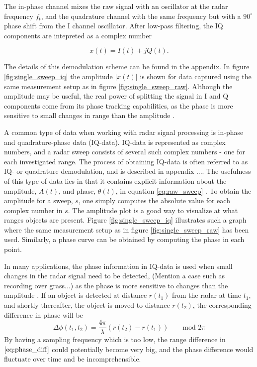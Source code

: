 The in-phase channel mixes the raw signal with an oscillator at the radar frequency $f_t$, and the quadrature channel with the same frequency but with a $90^\circ$ phase shift from the I channel oscillator. After low-pass filtering, the IQ components are intepreted as a complex number

\begin{equation}
	x(t) = I(t) + jQ(t).
\end{equation}

The details of this demodulation scheme can be found in the appendix. In figure \ref{fig:single_sweep_iq} the amplitude $|x(t)|$ is shown for data captured using the same measurement setup as in figure \ref{fig:single_sweep_raw}. Although the amplitude may be useful, the real power of splitting the signal in I and Q components come from its phase tracking capabilities, as the phase is more sensitive to small changes in range than the amplitude \citep{lien_gillian_karagozler_amihood_schwesig_olson_raja_poupyrev_2016}.





A common type of data when working with radar signal processing is in-phase and quadrature-phase data (IQ-data). IQ-data is represented as complex numbers, and a radar sweep consists of several such complex numbers - one for each investigated range. The process of obtaining IQ-data is often referred to as IQ- or quadrature demodulation, and is described in appendix .... The usefulness of this type of data lies in that it contains explicit information about the amplitude, $A(t)$, and phase, $\theta(t)$, in equation \eqref{eq:raw_sweep} \citep{richards_2014}. To obtain the amplitude for a sweep, $s$, one simply computes the absolute value for each complex number in $s$. The amplitude plot is a good way to visualize at what ranges objects are present. Figure \ref{fig:single_sweep_iq} illustrates such a graph where the same measurement setup as in figure \ref{fig:single_sweep_raw} has been used. Similarly, a phase curve can be obtained by computing the phase in each point.

In many applications, the phase information in IQ-data is used when small changes in the radar signal need to be detected, (Mention a case such as recording over grass...) as the phase is more sensitive to changes than the amplitude \citep{lien_gillian_karagozler_amihood_schwesig_olson_raja_poupyrev_2016}. If an object is detected at distance $r(t_1)$ from the radar at time $t_1$, and shortly thereafter, the object is moved to distance $r(t_2)$, the corresponding difference in phase will be
\begin{equation}
	\label{eq:phase_diff}
	\Delta\phi(t_1, t_2)=\frac{4\pi}{\lambda}(r(t_2)-r(t_1)) \quad\quad \textrm{mod 2$\pi$}
\end{equation}
By having a sampling frequency which is too low, the range difference in $\eqref{eq:phase_diff}$ could potentially become very big, and the phase difference would fluctuate over time and be incomprehensible.


